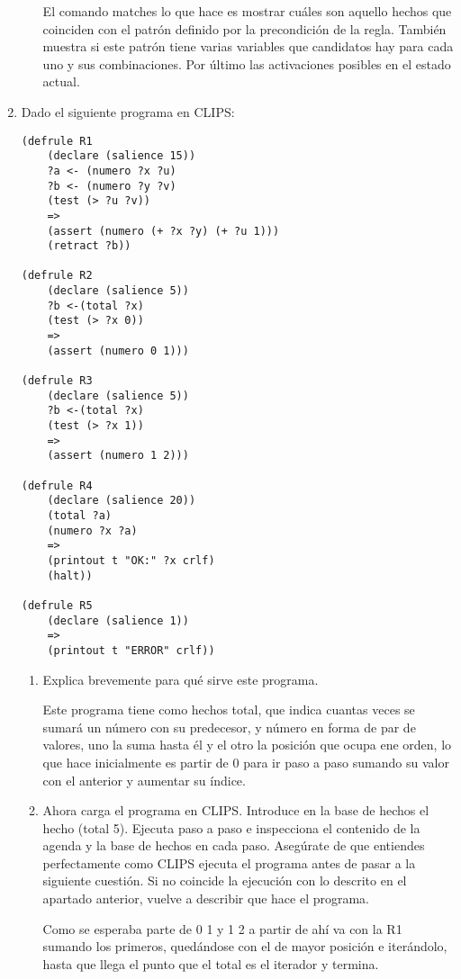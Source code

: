 \documentclass[12pt, spanish, pdftex]{UC3M_document}
\begin{document}
\begin{enumerate}
\begin{enumerate}
		            El comando matches lo que hace es mostrar cuáles son aquello hechos que coinciden con el patrón definido por la precondición de la regla. También muestra si este patrón tiene varias variables que candidatos hay para cada uno y sus combinaciones. Por último las activaciones posibles en el estado actual.

	      \end{enumerate}
	      \pagebreak

	\item Dado el siguiente programa en CLIPS:
	      \begin{lstlisting}
(defrule R1
    (declare (salience 15))
    ?a <- (numero ?x ?u)
    ?b <- (numero ?y ?v)
    (test (> ?u ?v))
    =>
    (assert (numero (+ ?x ?y) (+ ?u 1)))
    (retract ?b))

(defrule R2
    (declare (salience 5))
    ?b <-(total ?x)
    (test (> ?x 0))
    =>
    (assert (numero 0 1)))

(defrule R3
    (declare (salience 5))
    ?b <-(total ?x)
    (test (> ?x 1))
    =>
    (assert (numero 1 2)))

(defrule R4
    (declare (salience 20))
    (total ?a)
    (numero ?x ?a)
    =>
    (printout t "OK:" ?x crlf)
    (halt))

(defrule R5
    (declare (salience 1))
    =>
    (printout t "ERROR" crlf))
\end{lstlisting}
	      \begin{enumerate}
		      \item Explica brevemente para qué sirve este programa.

		            Este programa tiene como hechos total, que indica cuantas veces se sumará un número con su predecesor, y número en forma de par de valores, uno la suma hasta él y el otro la posición que ocupa ene orden, lo que hace inicialmente es partir de 0 para ir paso a paso sumando su valor con el anterior y aumentar su índice.

		      \item Ahora carga el programa en CLIPS. Introduce en la base de hechos el hecho (total 5). Ejecuta paso a paso e inspecciona el contenido de la agenda y la base de hechos en cada paso. Asegúrate de que entiendes perfectamente como CLIPS ejecuta el programa antes de pasar a la siguiente cuestión. Si no coincide la ejecución con lo descrito en el apartado anterior, vuelve a describir que hace el programa.

		            Como se esperaba parte de 0 1 y 1 2 a partir de ahí va con la R1 sumando los primeros, quedándose con el de mayor posición e iterándolo, hasta que llega el punto que el total es el iterador y termina.
		            \pagebreak


\end{enumerate}
\end{enumerate}
\end{document}

